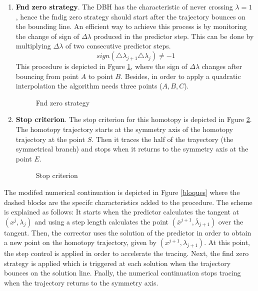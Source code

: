 \documentclass[conference]{IEEEtran}
\begin{document}
\begin{enumerate}
\item { \bf Fnd zero strategy}. The DBH
has the characteristic of never crossing $\lambda=1$
\cite{homo_iscas05}, hence the fndig zero strategy
should start after the trajectory   bounces on the bounding line. An
efficient way to achieve this process is by monitoring the
change of sign of $\Delta\lambda$ produced in the predictor step. This
can be done by multiplying
$\Delta\lambda$ of two consecutive predictor steps. 
\begin{displaymath}
sign(\triangle \lambda_{j+1}  \triangle \lambda_j) \ne -1 
\label{zero1}
\end{displaymath}
This procedure is depicted in Fgure \ref{halftrack3},
where the  sign of  $\Delta\lambda$ changes after bouncing from point
$A$ to point $B$. Besides, in order to apply a quadratic interpolation
the algorithm needs three points ($A,B,C$).

\begin{figure}[hbtp]
\centerline{
\epsfxsize=50mm
}
\caption{Fnd zero strategy}
\label{halftrack3}
\end{figure}
\item{\bf Stop criterion}. The stop criterion for this homotopy
is depicted in Fgure \ref{halftrack1}. The homotopy
trajectory starts at the symmetry axis of
the homotopy trajectory at the point $S$. Then it traces the half of
the trayectory (the symmetrical branch) and stops
when it returns to the symmetry axis at the point $E$.

\begin{figure}[hbtp]
\centerline{
\epsfxsize=55mm
}
\caption{Stop criterion}
\label{halftrack1}
\end{figure}
\end{enumerate}

The modifed numerical continuation is depicted
in Fgure \ref{bloques}
where the dashed blocks are the specifc
characteristics added to the procedure.
The scheme is explained as follows: It starts when
the predictor  calculates the tangent at
$(x^j,\lambda_j)$ and using a step length calculates
the point $(\bar{x}^{j+1},\bar{\lambda}_{j+1})$
over the tangent. Then, the corrector uses the solution
of the predictor in order to obtain
a new point on the homotopy trajectory, 
given by  $(x^{j+1},\lambda_{j+1})$.
At this point, the step control is applied in
order to accelerate the tracing.
Next, the find zero strategy is applied which is 
triggered at each solution when the trajectory bounces on
the solution line.
Fnally, the numerical continuation stops tracing when the trajectory returns to the symmetry axis.
\end{document}
